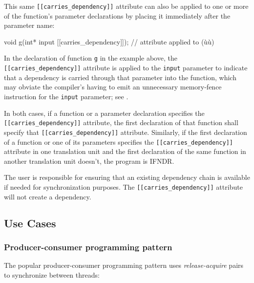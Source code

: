 This same \lstinline![[carries_dependency]]! attribute can also be applied
to one or more of the function's parameter declarations by placing it
immediately after the parameter name:

\begin{emcppslisting}
void g(int* input [[carries_dependency]]); // attribute applied to (ù{}ù)
\end{emcppslisting}
    
\noindent In the declaration of function \lstinline!g! in the example above, the
\lstinline![[carries_dependency]]! attribute is applied to the
\lstinline!input! parameter to indicate that a dependency is carried
through that parameter into the function, which may obviate the
compiler's having to emit an unnecessary memory-fence instruction for
the \lstinline!input! parameter; see .

In both cases, if a function or a parameter declaration specifies the
\lstinline![[carries_dependency]]! attribute, the first declaration of
that function shall specify that \lstinline![[carries_dependency]]!
attribute. Similarly, if the first declaration of a function or one of
its parameters specifies the \lstinline![[carries_dependency]]! attribute
in one translation unit and the first declaration of the same function
in another translation unit doesn't, the program is IFNDR.

The user is responsible for ensuring that an existing dependency chain
is available if needed for synchronization purposes. The
\lstinline![[carries_dependency]]! attribute will not create a \mbox{dependency}.

\subsection[Use Cases]{Use Cases}\label{use-cases-carriesdependency}

\subsubsection[Producer-consumer programming pattern]{Producer-consumer programming pattern}\label{producer-consumer-programming-pattern}

The popular producer-consumer programming pattern uses
\emph{release-acquire} pairs to synchronize between threads:

